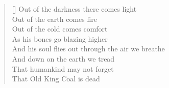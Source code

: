 \begin{verse}[\versewidth]
Out of the darkness there comes light\\
Out of the earth comes fire\\
Out of the cold comes comfort\\
As his bones go blazing higher\\
And his soul flies out through the air we breathe\\
And down on the earth we tread\\
That humankind may not forget\\
That Old King Coal is dead


\end{verse}